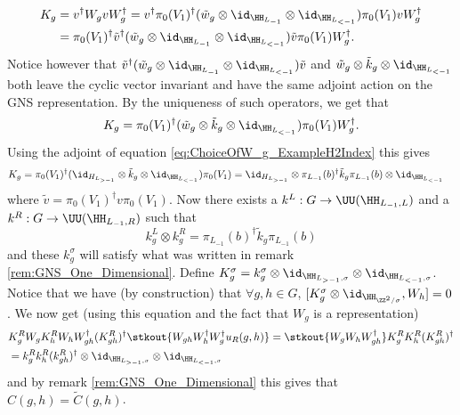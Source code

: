 \begin{align}
	K_g&=v^\dagger W_g v W_g^\dagger=v^\dagger \pi_{0}(V_1)^{\dagger}(\tilde{w}_g\otimes\id_{\HH_{L_{-1}}}\otimes\id_{\HH_{L_{<-1}}}) \pi_{0}(V_1) v W_g^\dagger\\
	&=\pi_{0}(V_1)^{\dagger}\tilde v^\dagger(\tilde{w}_g\otimes\id_{\HH_{L_{-1}}}\otimes\id_{\HH_{L_{<-1}}}) \tilde v \pi_{0}(V_1) W_g^\dagger.
\end{align}
Notice however that $\tilde v^\dagger(\tilde{w}_g\otimes\id_{\HH_{L_{-1}}}\otimes\id_{\HH_{L_{<-1}}}) \tilde v$ and $\tilde{w}_g\otimes\tilde{k}_g\otimes\id_{\HH_{L_{<-1}}}$ both leave the cyclic vector invariant and have the same adjoint action on the GNS representation. By the uniqueness of such operators, we get that
\begin{equation}
	K_g=\pi_{0}(V_1)^{\dagger}(\tilde{w}_g\otimes\tilde{k}_g\otimes\id_{\HH_{L_{<-1}}}) \pi_{0}(V_1) W_g^\dagger.
\end{equation}
Using the adjoint of equation \eqref{eq:ChoiceOfW_g_ExampleH2Index} this gives
\begin{align}
	K_g&=\pi_{0}(V_1)^{\dagger}(\id_{H_{L_{>-1}}}\otimes \tilde k_g \otimes\id_{\HH_{L_{<-1}}}) \pi_{0}(V_1)=\id_{H_{L_{>-1}}}\otimes \pi_{L_{-1}}(b)^\dagger \tilde k_g \pi_{L_{-1}}(b) \otimes\id_{\HH_{L_{<-1}}}
\end{align}
where $\tilde{v}=\pi_0(V_1)^\dagger v\pi_0(V_1)$. Now there exists a $k^L:G\rightarrow \UU(\HH_{L_{-1},L})$ and a $k^R:G\rightarrow \UU(\HH_{L_{-1},R})$ such that
\begin{equation}
	k^L_g\otimes k^R_g=\pi_{L_{-1}}(b)^\dagger \tilde k_g \pi_{L_{-1}}(b)
\end{equation}
and these $k^\sigma_g$ will satisfy what was written in remark \ref{rem:GNS_One_Dimensional}. Define $K^\sigma_g=k^\sigma_g\otimes\id_{\HH_{L_{>-1},\sigma}}\otimes\id_{\HH_{L_{<-1},\sigma}}$. Notice that we have (by construction) that $\forall g,h\in G$, $[K^\sigma_g\otimes\id_{\HH_{\ZZ^2/\sigma}},W_h]=0$. We now get (using this equation and the fact that $W_g$ is a representation)
\begin{align}
	&K_g^R W_g K_h^R W_h W_{gh}^\dagger (K_{gh}^R)^\dagger \stkout{W_{gh}W_h^\dagger W_g^\dagger u_R(g,h)}=\stkout{W_g W_h W_{gh}^\dagger} K_g^R K_h^R (K_{gh}^R)^\dagger\\
	\nonumber
	&=k_g^R k_h^R (k_{gh}^R)^\dagger\otimes \id_{\HH_{L_{>-1},\sigma}}\otimes\id_{\HH_{L_{<-1},\sigma}}
\end{align}
and by remark \ref{rem:GNS_One_Dimensional} this gives that $C(g,h)=\tilde{C}(g,h)$.

